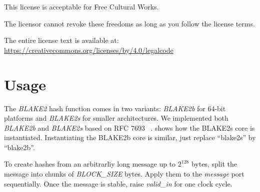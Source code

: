 \documentclass[%
	a4paper,
]
{article}
\newcommand{\todo}[1]{\textcolor{red}{#1}}
\newcommand{\done}[1]{}
\begin{document}
This license is acceptable for Free Cultural Works.

The licensor cannot revoke these freedoms as long as you follow the license terms.

The entire license text is available at:
\href{https://creativecommons.org/licenses/by/4.0/legalcode}
	{https://creativecommons.org/licenses/by/4.0/legalcode}


\pagebreak
%
%
%
%
%
%
%
%
%
%
%
%
\section{Usage}
\label{sec:usage}

\done{Put in here typical usage examples the can be copied/pasted and ready
to be used. I think it would be cool to have this for all the variants given
in \Cref{sec:resource-allocation}.}

The \emph{BLAKE2} hash function comes in two variants: \emph{BLAKE2b} for
64-bit platforms and \emph{BLAKE2s} for smaller architectures.
%
We implemented both \emph{BLAKE2b} and \emph{BLAKE2s} based on RFC 7693~%
\autocite{rfc7693}.	
%
 shows how the BLAKE2s core is instantiated. Instantiating
the BLAKE2b core is similar, just replace ``blake2s'' by ``blake2b''.

To create hashes from an arbitrarliy long message up to $2^{128}$ bytes,
split the message into chunks of \emph{BLOCK_SIZE} bytes. Apply
them to the \emph{message} port sequentially. Once the message is stable,
raise \emph{valid_in} for one clock cycle.
\end{document}

